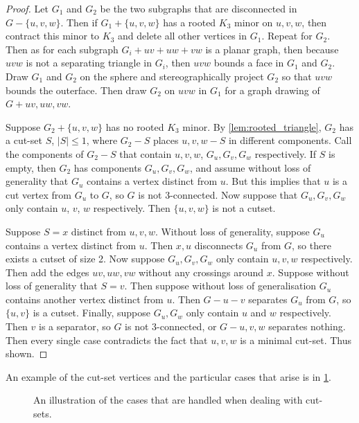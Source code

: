 \begin{proof}
	Let $G_1$ and $G_2$ be the two subgraphs that are disconnected in $G - \{u,v,w\}$. Then if $G_1 + \{u,v,w\}$ has a rooted $K_3$ minor on $u,v,w$, then contract this minor to $K_3$ and delete all other vertices in $G_1$. Repeat for $G_2$. Then as for each subgraph $G_i + uv + uw + vw$ is a planar graph, then because $uvw$ is not a separating triangle in $G_i$, then $uvw$ bounds a face in $G_1$ and $G_2$. Draw $G_1$ and $G_2$ on the sphere and stereographically project $G_2$ so that $uvw$ bounds the outerface. Then draw $G_2$ on $uvw$ in $G_1$ for a graph drawing of $G + uv, uw, vw$. 
	
	Suppose $G_2 + \{u,v,w\}$ has no rooted $K_3$ minor. By \cref{lem:rooted_triangle}, $G_2$ has a cut-set $S$, $|S| \leq 1$, where $G_2 - S$ places $u,v,w - S$ in different components. Call the components of $G_2 - S$ that contain $u,v,w$, $G_u, G_v, G_w$ respectively. If $S$ is empty, then $G_2$ has components $G_u, G_v, G_w$, and assume without loss of generality that $G_u$ contains a vertex distinct from $u$. But this implies that $u$ is a cut vertex from $G_u$ to $G$, so $G$ is not $3$-connected. Now suppose that $G_u,G_v, G_w$ only contain $u$, $v$, $w$ respectively. Then $\{u,v,w\}$ is not a cutset. 
	
	Suppose $S = x$ distinct from $u,v,w$. Without loss of generality, suppose $G_u$ contains a vertex distinct from $u$. Then $x, u$ disconnects $G_u$ from $G$, so there exists a cutset of size 2. Now suppose $G_u, G_v, G_w$ only contain $u,v,w$ respectively. Then add the edges $uv, uw, vw$ without any crossings around $x$. Suppose without loss of generality that $S = v$. Then suppose without loss of generalisation $G_u$ contains another vertex distinct from $u$. Then $G - u - v$ separates $G_u$ from $G$, so $\{u,v\}$ is a cutset. Finally, suppose $G_u, G_w$ only contain $u$ and $w$ respectively. Then $v$ is a separator, so $G$ is not $3$-connected, or $G - u,v,w$ separates nothing. Then every single case contradicts the fact that $u,v,w$ is a minimal cut-set. Thus shown.
\end{proof}
An example of the cut-set vertices and the particular cases that arise is in \cref{fig:cutsets}.

\begin{figure}[h!]
	
	\caption[Decomposition of graph]{An illustration of the cases that are handled when dealing with cut-sets.}\label{fig:cutsets}
\end{figure}

